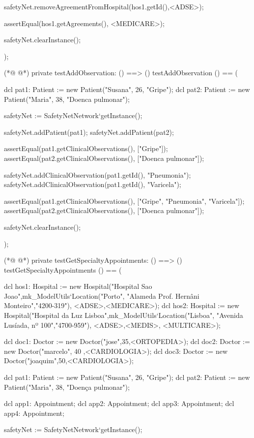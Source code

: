 \begin{vdmpp}[breaklines=true]
  safetyNet.removeAgreementFromHospital(hos1.getId(),<ADSE>);
  
  assertEqual(hos1.getAgreements(), {<MEDICARE>});
  
  safetyNet.clearInstance();
    
);


(*@
\label{testAddObservation:825}
@*)
private testAddObservation: () ==> ()
 testAddObservation () == (
  
  dcl pat1: Patient := new Patient("Susana", 26, "Gripe");
  dcl pat2: Patient := new Patient("Maria", 38, "Doenca pulmonar");
  
  safetyNet := SafetyNetNetwork`getInstance();
   
  safetyNet.addPatient(pat1);
  safetyNet.addPatient(pat2);

  assertEqual(pat1.getClinicalObservations(), ["Gripe"]);
  assertEqual(pat2.getClinicalObservations(), ["Doenca pulmonar"]);
  
  safetyNet.addClinicalObservation(pat1.getId(), "Pneumonia");
  safetyNet.addClinicalObservation(pat1.getId(), "Varicela");

  assertEqual(pat1.getClinicalObservations(), ["Gripe", "Pneumonia", "Varicela"]);
  assertEqual(pat2.getClinicalObservations(), ["Doenca pulmonar"]); 
   
  safetyNet.clearInstance();
    
);


(*@
\label{testGetSpecialtyAppointments:850}
@*)
private testGetSpecialtyAppointments: () ==> ()
 testGetSpecialtyAppointments () == (
 
  dcl hos1: Hospital := new Hospital("Hospital Sao Joao",mk_ModelUtils`Location("Porto", "Alameda Prof. Hernâni Monteiro","4200-319"), {<ADSE>,<MEDICARE>});
  dcl hos2: Hospital := new Hospital("Hospital da Luz Lisboa",mk_ModelUtils`Location("Lisboa", "Avenida Lusíada, nº 100","4700-959"), {<ADSE>,<MEDIS>, <MULTICARE>});
  
  dcl doc1: Doctor := new Doctor("jose",35,<ORTOPEDIA>);
  dcl doc2: Doctor := new Doctor("marcelo", 40 ,<CARDIOLOGIA>);
  dcl doc3: Doctor := new Doctor("joaquim",50,<CARDIOLOGIA>);
  
  dcl pat1: Patient := new Patient("Susana", 26, "Gripe");
  dcl pat2: Patient := new Patient("Maria", 38, "Doença pulmonar");
  
  dcl app1: Appointment;
  dcl app2: Appointment;
  dcl app3: Appointment;
  dcl app4: Appointment;
  
  safetyNet := SafetyNetNetwork`getInstance();
   

\end{vdmpp}
